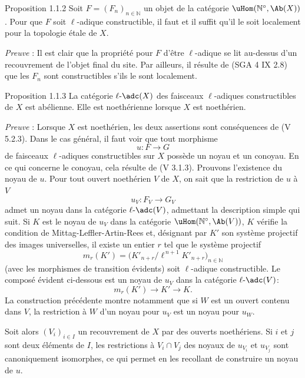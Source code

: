 \begin{statement}{Proposition 1.1.2}
Soit \(F=(F_n)_{n\in\mathbb{N}}\) un objet de la catégorie \(\uHom(\mathbb{N}^\circ,\Ab(X))\). Pour que \(F\) soit \(\ell\)-adique constructible, il faut et il suffit qu'il le soit localement pour la topologie étale de \(X\).
\end{statement}

\emph{Preuve} : Il est clair que la propriété pour \(F\) d'être \(\ell\)-adique se lit au-dessus d'un recouvrement de l'objet final du site. Par ailleurs, il résulte de (SGA 4 IX 2.8) que les \(F_n\) sont constructibles s'ils le sont localement.

\begin{statement}{Proposition 1.1.3}
La catégorie \(\ell\text{-}\adc(X)\) des faisceaux \(\ell\)-adiques constructibles de \(X\) est abélienne. Elle est noethérienne lorsque \(X\) est noethérien.
\end{statement}

\emph{Preuve} : Lorsque \(X\) est noethérien, les deux assertions sont conséquences de (V 5.2.3). Dans le cas général, il faut voir que tout morphisme
\[
u:F\longrightarrow G
\]
de faisceaux \(\ell\)-adiques constructibles sur \(X\) possède un noyau et un conoyau.
En ce qui
concerne le conoyau, cela résulte de (V 3.1.3). Prouvons l'existence du noyau de \(u\). Pour tout ouvert noethérien \(V\) de \(X\), on sait que la restriction de \(u\) à \(V\)
\[
u_V:F_V\longrightarrow G_V
\]
admet un noyau dans la catégorie \(\ell\text{-}\adc(V)\), admettant la description simple qui suit. Si \(K\) est le noyau de \(u_V\) dans la catégorie \(\uHom(\mathbb{N}^\circ,\Ab(V))\), \(K\) vérifie la condition de Mittag-Leffler-Artin-Rees et, désignant par \(K'\) son système projectif des images universelles, il existe un entier \(r\) tel que le système projectif
\[
m_r(K')=\bigl(K'_{n+r}/\ell^{\,n+1}K'_{n+r}\bigr)_{n\in\mathbb{N}}
\]
(avec les morphismes de transition évidents) soit \(\ell\)-adique constructible. Le composé évident ci-dessous est un noyau de \(u_V\) dans la catégorie \(\ell\text{-}\adc(V)\):
\[
m_r(K')\longrightarrow K'\longrightarrow K.
\]
La construction précédente montre notamment que si \(W\) est un ouvert contenu dans \(V\), la restriction à \(W\) d'un noyau pour \(u_V\) est un noyau pour \(u_W\).

Soit alors \((V_i)_{i\in I}\) un recouvrement de \(X\) par des ouverts noethériens. Si \(i\) et \(j\) sont deux éléments de \(I\), les restrictions à \(V_i\cap V_j\) des noyaux de \(u_{V_i}\) et \(u_{V_j}\) sont canoniquement isomorphes, ce qui permet en les recollant de construire un noyau de \(u\).

